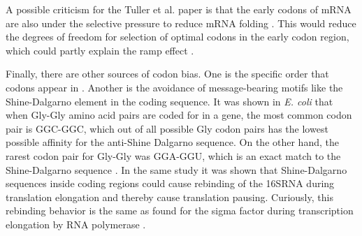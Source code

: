 A possible criticism for the Tuller et al. paper is that the
early codons of mRNA are also under the selective pressure to reduce mRNA
folding \cite{gu_universal_2010}. This would reduce the degrees of freedom for
selection of optimal codons in the early codon region, which could partly
explain the ramp effect \cite{plotkin_synonymous_2011}.

Finally, there are other sources of codon bias. One is the specific order that
codons appear in \cite{cannarozzi_role_2010}. Another is the avoidance of
message-bearing motifs like the Shine-Dalgarno element in the coding sequence.
It was shown in \textit{E. coli} that when Gly-Gly amino acid pairs are coded
for in a gene, the most common codon pair is GGC-GGC, which out of all possible
Gly codon pairs has the lowest possible affinity for the anti-Shine Dalgarno
sequence. On the other hand, the rarest codon pair for Gly-Gly was GGA-GGU,
which is an exact match to the Shine-Dalgarno sequence
\cite{li_anti-shine-dalgarno_2012}. In the same study it was shown that
Shine-Dalgarno sequences inside coding regions could cause rebinding of the
16SRNA during translation elongation and thereby cause translation pausing.
Curiously, this rebinding behavior is the same as found for the sigma factor
during transcription elongation by RNA polymerase \cite{mooney_sigma_2005}.
